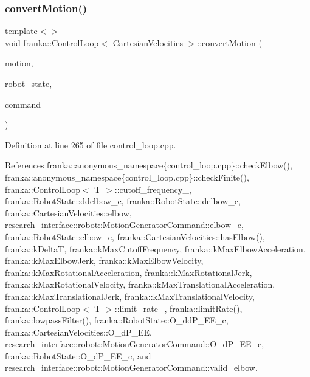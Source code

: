\mbox{\label{classfranka_1_1ControlLoop_ae6c2b0808a95542fa41e2351f7d8f242}} 
\subsubsection{\texorpdfstring{convert\+Motion()}{convertMotion()}\hspace{0.1cm}{\footnotesize\ttfamily [5/5]}}
{\footnotesize\ttfamily template$<$$>$ \\
void \hyperlink{classfranka_1_1ControlLoop}{franka\+::\+Control\+Loop}$<$ \hyperlink{classfranka_1_1CartesianVelocities}{Cartesian\+Velocities} $>$\+::convert\+Motion (\begin{DoxyParamCaption}\item[{const \hyperlink{classfranka_1_1CartesianVelocities}{Cartesian\+Velocities} \&}]{motion,  }\item[{const \hyperlink{structfranka_1_1RobotState}{Robot\+State} \&}]{robot\+\_\+state,  }\item[{\hyperlink{structresearch__interface_1_1robot_1_1MotionGeneratorCommand}{research\+\_\+interface\+::robot\+::\+Motion\+Generator\+Command} $\ast$}]{command }\end{DoxyParamCaption})\hspace{0.3cm}{\ttfamily [private]}}



Definition at line 265 of file control\+\_\+loop.\+cpp.



References franka\+::anonymous\+\_\+namespace\{control\+\_\+loop.\+cpp\}\+::check\+Elbow(), franka\+::anonymous\+\_\+namespace\{control\+\_\+loop.\+cpp\}\+::check\+Finite(), franka\+::\+Control\+Loop$<$ T $>$\+::cutoff\+\_\+frequency\+\_\+, franka\+::\+Robot\+State\+::ddelbow\+\_\+c, franka\+::\+Robot\+State\+::delbow\+\_\+c, franka\+::\+Cartesian\+Velocities\+::elbow, research\+\_\+interface\+::robot\+::\+Motion\+Generator\+Command\+::elbow\+\_\+c, franka\+::\+Robot\+State\+::elbow\+\_\+c, franka\+::\+Cartesian\+Velocities\+::has\+Elbow(), franka\+::k\+DeltaT, franka\+::k\+Max\+Cutoff\+Frequency, franka\+::k\+Max\+Elbow\+Acceleration, franka\+::k\+Max\+Elbow\+Jerk, franka\+::k\+Max\+Elbow\+Velocity, franka\+::k\+Max\+Rotational\+Acceleration, franka\+::k\+Max\+Rotational\+Jerk, franka\+::k\+Max\+Rotational\+Velocity, franka\+::k\+Max\+Translational\+Acceleration, franka\+::k\+Max\+Translational\+Jerk, franka\+::k\+Max\+Translational\+Velocity, franka\+::\+Control\+Loop$<$ T $>$\+::limit\+\_\+rate\+\_\+, franka\+::limit\+Rate(), franka\+::lowpass\+Filter(), franka\+::\+Robot\+State\+::\+O\+\_\+dd\+P\+\_\+\+E\+E\+\_\+c, franka\+::\+Cartesian\+Velocities\+::\+O\+\_\+d\+P\+\_\+\+EE, research\+\_\+interface\+::robot\+::\+Motion\+Generator\+Command\+::\+O\+\_\+d\+P\+\_\+\+E\+E\+\_\+c, franka\+::\+Robot\+State\+::\+O\+\_\+d\+P\+\_\+\+E\+E\+\_\+c, and research\+\_\+interface\+::robot\+::\+Motion\+Generator\+Command\+::valid\+\_\+elbow.


